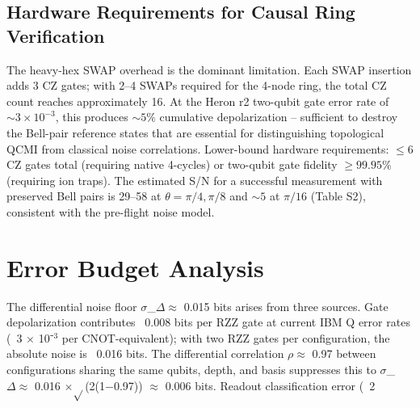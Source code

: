 \documentclass[aps,prl,showpacs]{revtex4-2}
\begin{document}
\subsection{Hardware Requirements for Causal Ring Verification}

The heavy-hex SWAP overhead is the dominant limitation. Each SWAP insertion adds 3 CZ gates; with 2--4 SWAPs required for the 4-node ring, the total CZ count reaches approximately 16. At the Heron r2 two-qubit gate error rate of $\sim3\times10^{-3}$, this produces $\sim5\%$ cumulative depolarization -- sufficient to destroy the Bell-pair reference states that are essential for distinguishing topological QCMI from classical noise correlations. Lower-bound hardware requirements: $\leq6$ CZ gates total (requiring native 4-cycles) or two-qubit gate fidelity $\geq99.95\%$ (requiring ion traps). The estimated S/N for a successful measurement with preserved Bell pairs is 29--58 at $\theta=\pi/4,\pi/8$ and $\sim5$ at $\pi/16$ (Table S2), consistent with the pre-flight noise model.


\section{Error Budget Analysis}


The differential noise floor $\sigma$_$\Delta\approx$ 0.015 bits arises from three sources. Gate depolarization contributes ~0.008 bits per RZZ gate at current IBM Q error rates (~3 $\times$ 10⁻$^3$ per CNOT-equivalent); with two RZZ gates per configuration, the absolute noise is ~0.016 bits. The differential correlation $\rho\approx$ 0.97 between configurations sharing the same qubits, depth, and basis suppresses this to $\sigma$_$\Delta\approx$ 0.016 $\times\sqrt{}$(2(1$-$0.97)) $\approx$ 0.006 bits. Readout classification error (~2%
\end{document}
